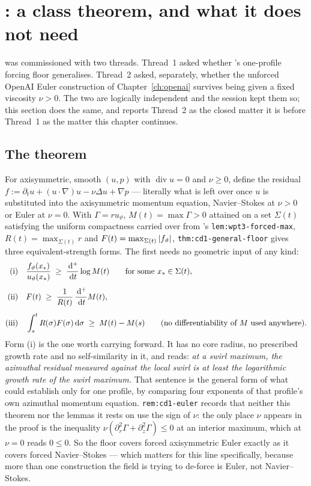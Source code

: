\section{\texorpdfstring{: a class theorem, and what it does not need}{S60: a class theorem, and what it does not need}}
\label{sec:ff-s60}

 was commissioned with two threads. Thread~1 asked whether 's
one-profile forcing floor generalises. Thread~2 asked, separately, whether the
unforced OpenAI Euler construction of Chapter~\ref{ch:openai} survives being
given a fixed viscosity \(\nu>0\). The two are logically independent and the
session kept them so; this section does the same, and reports Thread~2 as the
closed matter it is before Thread~1 as the matter this chapter continues.

\subsection{The theorem}
\label{sec:ff-s60-theorem}

For axisymmetric, smooth \((u,p)\) with \(\operatorname{div}u=0\) and
\(\nu\ge0\), define the residual
\(f:=\partial_tu+(u\cdot\nabla)u-\nu\Delta u+\nabla p\) --- literally what is
left over once \(u\) is substituted into the axisymmetric momentum equation,
Navier--Stokes at \(\nu>0\) or Euler at \(\nu=0\). With \(\Gamma=ru_\vartheta\),
\(M(t)=\max\Gamma>0\) attained on a set \(\Sigma(t)\) satisfying the uniform
compactness carried over from 's \texttt{lem:wpt3-forced-max},
\(R(t)=\max_{\Sigma(t)}r\) and \(F(t)=\max_{\Sigma(t)}\left|f_\vartheta\right|\),
\texttt{thm:cd1-general-floor} gives three equivalent-strength forms. The
first needs no geometric input of any kind:
\begin{align}
\text{(i)}\quad & \frac{f_\vartheta(x_*)}{u_\vartheta(x_*)}\;\ge\;
  \frac{\,\mathrm{d}^+}{\,\mathrm{d} t}\log M(t) \qquad\text{for some }x_*\in\Sigma(t), \\[4pt]
\text{(ii)}\quad & F(t)\;\ge\;\frac{1}{R(t)}\,\frac{\,\mathrm{d}^+}{\,\mathrm{d} t}M(t), \\[4pt]
\text{(iii)}\quad & \int_s^tR(\sigma)F(\sigma)\,\mathrm{d}\sigma\;\ge\;M(t)-M(s)
  \qquad\text{(no differentiability of }M\text{ used anywhere).}
\end{align}
Form (i) is the one worth carrying forward. It has no core radius, no
prescribed growth rate and no self-similarity in it, and reads: \emph{at a
swirl maximum, the azimuthal residual measured against the local swirl is at
least the logarithmic growth rate of the swirl maximum.} That sentence is the
general form of what  could establish only for one profile, by
comparing four exponents of that profile's own azimuthal momentum equation.
\texttt{rem:cd1-euler} records that neither this theorem nor the 
lemmas it rests on use the sign of \(\nu\): the only place \(\nu\) appears in
the proof is the inequality \(\nu(\partial_r^2\Gamma+\partial_z^2\Gamma)\le0\)
at an interior maximum, which at \(\nu=0\) reads \(0\le0\). So the floor
covers forced axisymmetric Euler exactly as it covers forced Navier--Stokes
--- which matters for this line specifically, because more than one
construction the field is trying to de-force is Euler, not Navier--Stokes.

